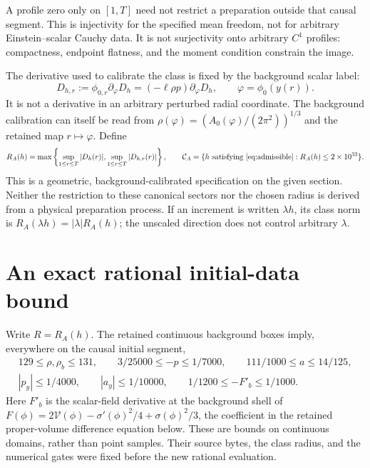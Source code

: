 \documentclass[11pt]{article}
\newcommand{\cV}{\mathcal V}
\begin{document}
A profile zero only on $[1,T]$ need not restrict a preparation outside
that causal segment. This is injectivity for the specified mean freedom,
not for arbitrary Einstein--scalar Cauchy data. It is not surjectivity
onto arbitrary $C^1$ profiles: compactness, endpoint flatness, and the
moment condition constrain the image.

The derivative used to calibrate the class is fixed by the background
scalar label:
\begin{equation}
 D_{h,r}:=\phi_{0,r}\partial_\varphi D_h
        =(-\ell\rho p)\partial_\varphi D_h,
 \qquad \varphi=\phi_0(y(r)).
 \label{eq:labelderivative}
\end{equation}
It is not a derivative in an arbitrary perturbed radial coordinate.
The background calibration can itself be read from
$\rho(\varphi)=(A_0(\varphi)/(2\pi^2))^{1/3}$ and the retained map
$r\mapsto\varphi$. Define
\begin{equation}
 R_A(h)=\max\left\{\sup_{1\le r\le T}|D_h(r)|,
                         \sup_{1\le r\le T}|D_{h,r}(r)|\right\},\qquad
 \mathcal C_A=\{h\text{ satisfying \eqref{eq:admissible}}:
                     R_A(h)\le2\times10^{33}\}.
 \label{eq:class}
\end{equation}
This is a geometric, background-calibrated specification on the given
section. Neither the restriction to these canonical sectors nor the
chosen radius is derived from a physical preparation process. If an
increment is written $\lambda h$, its class norm is
$R_A(\lambda h)=|\lambda|R_A(h)$; the unscaled direction does not control
arbitrary $\lambda$.

\section{An exact rational initial-data bound}\label{sec:rational}

Write $R=R_A(h)$. The retained continuous background boxes imply, everywhere
on the causal initial segment,
\begin{gather}
 129\le\rho,\rho_b\le131,\qquad
 3/25000\le-p\le1/7000,\qquad
 111/1000\le a\le14/125,\nonumber\\
 |p_y|\le1/4000,\qquad |a_y|\le1/10000,\qquad
 1/1200\le-F'_b\le1/1000.
 \label{eq:caps}
\end{gather}
Here $F'_b$ is the scalar-field derivative at the background shell of
$F(\phi)=2\cV(\phi)-\sigma'(\phi)^2/4+\sigma(\phi)^2/3$, the coefficient
in the retained proper-volume difference equation below. These are bounds on continuous
domains, rather than point samples. Their source bytes, the class radius,
and the numerical gates were fixed before the new rational evaluation.
\end{document}
